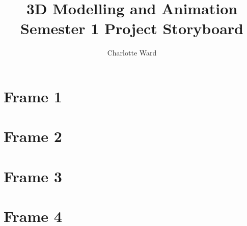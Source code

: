 \documentclass{scrartcl}
\begin{document}
\author{Charlotte Ward}
\title{3D Modelling and Animation \\ Semester 1 Project Storyboard}
\maketitle

\section*{Frame 1}

\section*{Frame 2}

\section*{Frame 3}

\section*{Frame 4}

\printbibliography
\end{document}
